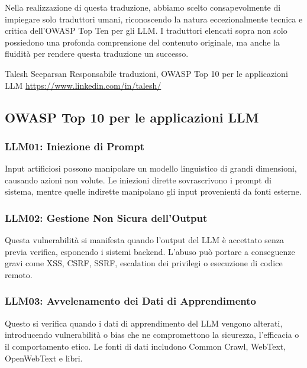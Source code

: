 \documentclass[
]{article}
\begin{document}
Nella realizzazione di questa traduzione, abbiamo scelto consapevolmente
di impiegare solo traduttori umani, riconoscendo la natura
eccezionalmente tecnica e critica dell'OWASP Top Ten per gli LLM. I
traduttori elencati sopra non solo possiedono una profonda comprensione
del contenuto originale, ma anche la fluidità per rendere questa
traduzione un successo.

Talesh Seeparsan Responsabile traduzioni, OWASP Top 10 per le
applicazioni LLM \url{https://www.linkedin.com/in/talesh/}

\subsection{﻿OWASP Top 10 per le applicazioni
LLM}\label{owasp-top-10-per-le-applicazioni-llm}

\subsubsection{LLM01: Iniezione di
Prompt}\label{llm01-iniezione-di-prompt}

Input artificiosi possono manipolare un modello linguistico di grandi
dimensioni, causando azioni non volute. Le iniezioni dirette
sovrascrivono i prompt di sistema, mentre quelle indirette manipolano
gli input provenienti da fonti esterne.

\subsubsection{LLM02: Gestione Non Sicura
dell'Output}\label{llm02-gestione-non-sicura-delloutput}

Questa vulnerabilità si manifesta quando l'output del LLM è accettato
senza previa verifica, esponendo i sistemi backend. L'abuso può portare
a conseguenze gravi come XSS, CSRF, SSRF, escalation dei privilegi o
esecuzione di codice remoto.

\subsubsection{LLM03: Avvelenamento dei Dati di
Apprendimento}\label{llm03-avvelenamento-dei-dati-di-apprendimento}

Questo si verifica quando i dati di apprendimento del LLM vengono
alterati, introducendo vulnerabilità o bias che ne compromettono la
sicurezza, l'efficacia o il comportamento etico. Le fonti di dati
includono Common Crawl, WebText, OpenWebText e libri.
\end{document}
